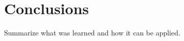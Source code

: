 \chapter{Conclusions}
\thispagestyle{fancy}
\label{c:conclusions}

Summarize what was learned and how it can be applied.
